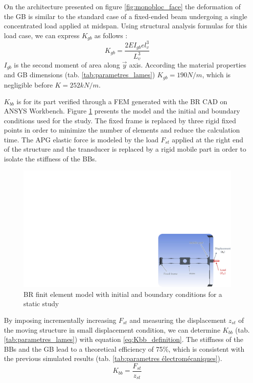 \documentclass[3p,twocolumn,preprint]{elsarticle}
\begin{document}
On the architecture presented on figure \ref{fig:monobloc_face} the deformation of the GB is similar to the standard case of a fixed-ended beam undergoing a single concentrated load applied at midspan. Using structural analysis formulas for this load case, we can express $K_{gb}$ as follows \cite{Leet1993} :
\begin{equation}
	K_{gb} = \dfrac{2EI_{gb}el_v^3}{L_v^3}
	\label{eq:Kgb_definition}
\end{equation}
$I_{gb}$ is the second moment of area along $\vec{y}$ axis. According the material properties and GB dimensions (tab. \ref{tab:parametres_lames}) \mbox{$K_{gb} = 190N/m$}, which is negligible before \mbox{$K=252kN/m$}.

$K_{bb}$ is for its part verified through a FEM generated with the BR CAD on ANSYS Workbench. Figure \ref{fig:fem_statique} presents the model and the initial and boundary conditions used for the study. The fixed frame is replaced by three rigid fixed points in order to minimize the number of elements and reduce the calculation time. The APG elastic force is modeled by the load $F_{st}$ applied at the right end of the structure and the transducer is replaced by a rigid mobile part in order to isolate the stiffness of the BBs.
\begin{figure}[!htbp]
\centering
\captionsetup{justification=centering}
	\includegraphics[trim={21.9cm 0cm 0cm 10.2cm},clip,width=.8\linewidth]{figures/fem_statique.pdf}
	\caption{BR finit element model with initial and boundary conditions for a static study}
\label{fig:fem_statique}
\end{figure}
By imposing incrementally increasing $F_{st}$ and measuring the displacement $z_{st}$ of the moving structure in small displacement condition, we can determine $K_{bb}$ (tab. \ref{tab:parametres_lames}) with equation \ref{eq:Kbb_definition}. The stiffness of the BBs and the GB lead to a theoretical efficiency of 75\%, which is consistent with the previous simulated results (tab. \ref{tab:parametres électromécaniques}).
\begin{equation}
	K_{bb} = \dfrac{F_{st}}{z_{st}}
	\label{eq:Kbb_definition}
\end{equation}
\end{document}
